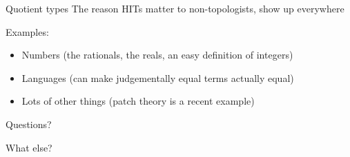 \documentclass[xcolor=svgnames]{beamer}
\begin{document}
\begin{frame}{Quotient types}
  The reason HITs matter to non-topologists, show up everywhere

  Examples:
  \begin{itemize}
  \item Numbers (the rationals, the reals, an easy definition of integers)
  \item Languages (can make judgementally equal terms actually equal)
  \item Lots of other things (patch theory is a recent example)
  \end{itemize}
\end{frame}

\begin{frame}{Questions?}
  \begin{center}
    \Huge What else?
  \end{center}
\end{frame}
\end{document}
